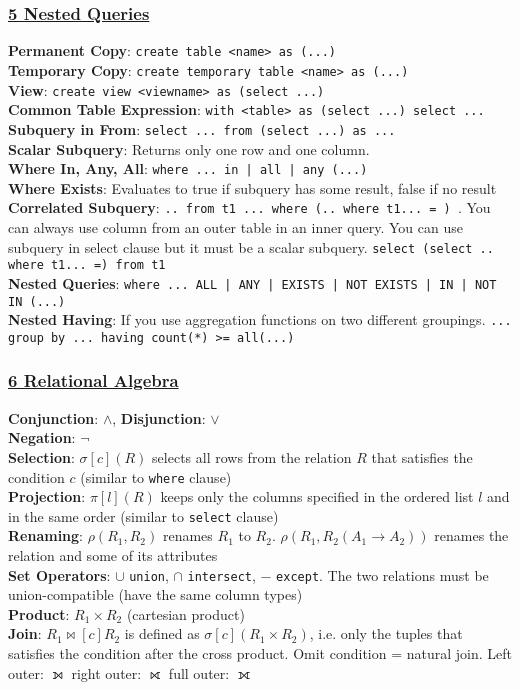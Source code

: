 \documentclass{article}
\begin{document}
{\begin{multicols*}{3}
\subsubsection*{\underline{5 Nested Queries}}
\textbf{Permanent Copy}: \texttt{create table <name> as (...)}\\
\textbf{Temporary Copy}: \texttt{create temporary table <name> as (...) }\\
\textbf{View}: \texttt{create view <viewname> as (select ...)}\\
\textbf{Common Table Expression}: \texttt{with <table> as (select ...) select ...} \\
\textbf{Subquery in From}: \texttt{select ... from (select ...) as ...} \\
\textbf{Scalar Subquery}: Returns only one row and one column. \\
\textbf{Where In, Any, All}: \texttt{where ... in | all | any (...)}  \\
\textbf{Where Exists}: Evaluates to true if subquery has some result, false if no result \\
\textbf{Correlated Subquery}: \texttt{.. from t1 ... where (.. where t1... = ) }. You can always use column from an outer table in an inner query. You can use subquery in select clause but it must be a scalar subquery. \texttt{select (select .. where t1... =) from t1} \\
\textbf{Nested Queries}: \texttt{where ... ALL | ANY | EXISTS | NOT EXISTS | IN | NOT IN (...) } \\
\textbf{Nested Having}: If you use aggregation functions on two different groupings. \texttt{... group by ... having count(*) >= all(...)}
\subsubsection*{\underline{6 Relational Algebra}}
\textbf{Conjunction}: $\wedge$, \textbf{Disjunction}: $\vee$\\
\textbf{Negation}: $\neg$\\
\textbf{Selection}: $\sigma[c](R)$ selects all rows from the relation $R$ that satisfies the condition $c$ (similar to \texttt{where} clause) \\
\textbf{Projection}: $\pi[l](R)$ keeps only the columns specified in the ordered list $l$ and in the same order  (similar to \texttt{select} clause) \\
\textbf{Renaming}: $\rho(R_1,R_2)$ renames $R_1$ to $R_2$. $\rho(R_1,R_2(A_1\to A_2))$ renames the relation and some of its attributes \\
\textbf{Set Operators}: $\cup$ \texttt{union}, $\cap$ \texttt{intersect}, $-$ \texttt{except}. The two relations must be union-compatible (have the same column types) \\
\textbf{Product}: $R_1\times R_2$ (cartesian product)\\
\textbf{Join}: $R_1\bowtie[c] R_2$ is defined as $\sigma[c](R_1\times R_2)$, i.e. only the tuples that satisfies the condition after the cross product. Omit condition = natural join. Left outer: $\leftouterjoin$ right outer: $\rightouterjoin$ full outer: $\fullouterjoin$

\end{multicols*}}
\end{document}
